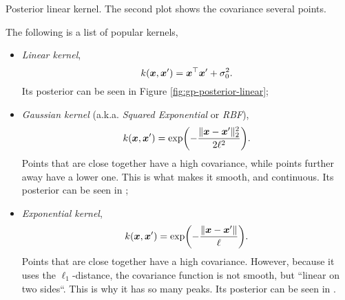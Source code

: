 \begin{marginfigure}
  \caption{Posterior linear kernel. The second plot shows the covariance \wrt several
  points.}
  \label{fig:gp-posterior-linear}
\end{marginfigure}

The following is a list of popular kernels,
\begin{itemize}
  \item \textit{Linear kernel}, \[
      k(\bm{x},\bm{x}') = \bm{x}^\top\bm{x}' + \sigma_0^2.
    \]
    Its posterior can be seen in Figure \ref{fig:gp-posterior-linear};

  \item \textit{Gaussian kernel} (a.k.a. \textit{Squared Exponential} or
    \textit{RBF}), \[
      k(\vec{x},\vec{x}') = \exp \lft( -\frac{\lVert \vec{x}-\vec{x}'
      \rVert^2_2}{2\ell^2} \rgt).
    \]
    Points that are close together have a high covariance, while points further
    away have a lower one. This is what makes it smooth, and continuous. Its
    posterior can be seen in ;

  \item \textit{Exponential kernel}, \[
      k(\vec{x},\vec{x}') = \exp \lft( -\frac{\lVert \vec{x}-\vec{x}' \rVert}{\ell} \rgt).
    \]
    Points that are close together have a high covariance. However, because it
    uses the $\ell_1$-distance, the covariance function is not smooth, but
    ``linear on two sides``.  This is why it has so many peaks. Its posterior
    can be seen in .
\end{itemize}

